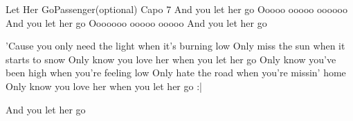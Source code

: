 \begin{song}{Let Her Go}{Passenger}{(optional) Capo 7}
And you let her go
Ooooo ooooo oooooo
And you let her go
Ooooooo ooooo ooooo
And you let her go


'Cause you only need the light when it's burning low
Only miss the sun when it starts to snow
Only know you love her when you let her go
Only know you've been high when you're feeling low
Only hate the road when you're missin' home
Only know you love her when you let her go          :|

And you let her go
\end{song}
